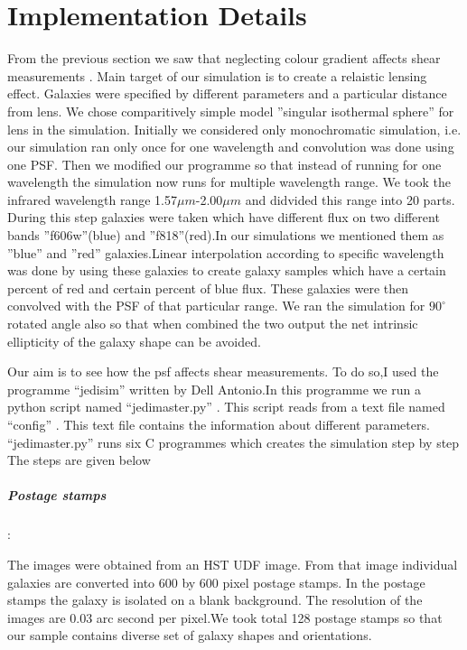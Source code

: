 \chapter{Implementation Details}


From the previous section we saw that neglecting colour gradient affects shear measurements . Main target of our simulation is
to create a relaistic lensing effect. Galaxies were specified by different parameters and a particular distance from lens. We chose
comparitively simple model ''singular isothermal sphere'' for lens in the simulation. Initially we considered only monochromatic simulation,
i.e. our simulation ran only once for one wavelength and convolution was done using one PSF. Then we modified our programme so that instead
of running for one wavelength the simulation now runs for multiple wavelength range. We
took the infrared wavelength range 1.57$\mu m $-2.00$\mu m $ and didvided this range into 20 parts.  During this step galaxies were taken which have different
flux on two different bands ''f606w''(blue)  and ''f818''(red).In our simulations we mentioned them as ''blue'' and ''red'' galaxies.Linear
interpolation according to specific wavelength was done by using these galaxies to create galaxy samples which have
a certain percent of red and certain percent of blue flux. These galaxies were then convolved with the PSF of that particular range. We ran
the simulation for $90^{\circ}$ rotated angle also so that when combined the two output the net intrinsic ellipticity of the galaxy
shape can be avoided.

Our aim is to see how the psf affects shear measurements. To do so,I used the programme ``jedisim'' written by Dell Antonio.In this programme we run
a python script  named ``jedimaster.py'' . This script reads from a text file named ``config'' . This text file contains the information about different parameters.
``jedimaster.py'' runs six C programmes which creates the simulation step by step
The steps are given below

\paragraph{Postage stamps}:

 The images were obtained from an HST UDF image. From that image individual galaxies are converted into 600 by 600 pixel postage stamps.
In the postage stamps the galaxy is isolated on a blank background. The resolution of the images are 0.03 arc second per pixel.We took total 128 postage stamps so that our sample contains diverse
set of galaxy shapes and orientations.



